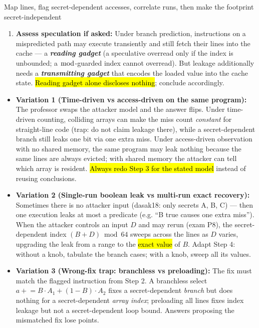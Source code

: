 \documentclass[12pt, a4paper]{article}
\newcommand{\term}[1]{\textbf{\textit{#1}}}        %
\newcommand{\imp}[1]{\hl{#1}}                       %
\begin{document}
\begin{schemebox}{Map lines, flag secret-dependent accesses, correlate runs, then make the footprint secret-independent}
\begin{enumerate}[label=\textbf{Step \arabic*:}, leftmargin=*]
    \item \textbf{Assess speculation if asked:} Under branch prediction, instructions on a mispredicted path may execute transiently and still fetch their lines into the cache --- a \term{reading gadget} (a speculative overread only if the index is unbounded; a $\bmod$-guarded index cannot overread). But leakage additionally needs a \term{transmitting gadget} that encodes the loaded value into the cache state. \imp{Reading gadget alone discloses nothing}; conclude accordingly.
\end{enumerate}
\end{schemebox}

\begin{trapbox}
\begin{itemize}
    \item \textbf{Variation 1 (Time-driven vs access-driven on the same program):} The professor swaps the attacker model and the answer flips. Under time-driven counting, colliding arrays can make the miss count \emph{constant} for straight-line code (trap: do not claim leakage there), while a secret-dependent branch still leaks one bit via one extra miss. Under access-driven observation with no shared memory, the same program may leak nothing because the same lines are always evicted; with shared memory the attacker can tell which array is resident. \imp{Always redo Step 3 for the stated model} instead of reusing conclusions.
    \item \textbf{Variation 2 (Single-run boolean leak vs multi-run exact recovery):} Sometimes there is no attacker input (dasak18: only secrets A, B, C) --- then one execution leaks at most a predicate (e.g. ``B true causes one extra miss''). When the attacker controls an input $D$ and may rerun (exam P8), the secret-dependent index $(B+D) \bmod 64$ sweeps across the lines as $D$ varies, upgrading the leak from a range to the \imp{exact value} of $B$. Adapt Step 4: without a knob, tabulate the branch cases; with a knob, sweep all its values.
    \item \textbf{Variation 3 (Wrong-fix trap: branchless vs preloading):} The fix must match the flagged instruction from Step 2. A branchless select $a \mathrel{+}= B \cdot A_1 + (1-B) \cdot A_2$ fixes a secret-dependent \emph{branch} but does nothing for a secret-dependent \emph{array index}; preloading all lines fixes index leakage but not a secret-dependent loop bound. Answers proposing the mismatched fix lose points.

\end{itemize}
\end{trapbox}
\end{document}
